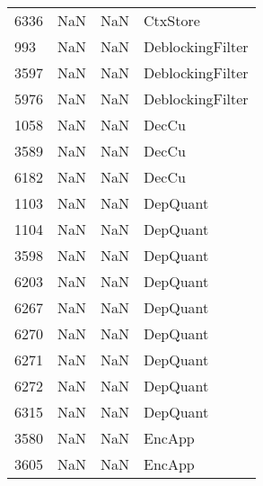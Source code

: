 \begin{tabular}{llll}
6336 &                   NaN &                        NaN &                                  CtxStore \\
993  &                   NaN &                        NaN &                          DeblockingFilter \\
3597 &                   NaN &                        NaN &                          DeblockingFilter \\
5976 &                   NaN &                        NaN &                          DeblockingFilter \\
1058 &                   NaN &                        NaN &                                     DecCu \\
3589 &                   NaN &                        NaN &                                     DecCu \\
6182 &                   NaN &                        NaN &                                     DecCu \\
1103 &                   NaN &                        NaN &                                  DepQuant \\
1104 &                   NaN &                        NaN &                                  DepQuant \\
3598 &                   NaN &                        NaN &                                  DepQuant \\
6203 &                   NaN &                        NaN &                                  DepQuant \\
6267 &                   NaN &                        NaN &                                  DepQuant \\
6270 &                   NaN &                        NaN &                                  DepQuant \\
6271 &                   NaN &                        NaN &                                  DepQuant \\
6272 &                   NaN &                        NaN &                                  DepQuant \\
6315 &                   NaN &                        NaN &                                  DepQuant \\
3580 &                   NaN &                        NaN &                                    EncApp \\
3605 &                   NaN &                        NaN &                                    EncApp \\

\end{tabular}

